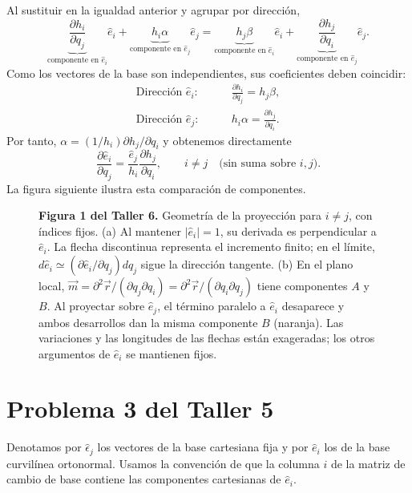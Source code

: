 Al sustituir en la igualdad anterior y agrupar por dirección,
\[
\underbrace{\frac{\partial h_i}{\partial q_j}}_{\text{componente en }\hat e_i}\hat e_i
+\underbrace{h_i\alpha}_{\text{componente en }\hat e_j}\hat e_j
=\underbrace{h_j\beta}_{\text{componente en }\hat e_i}\hat e_i
+\underbrace{\frac{\partial h_j}{\partial q_i}}_{\text{componente en }\hat e_j}\hat e_j.
\]
Como los vectores de la base son independientes, sus coeficientes deben coincidir:
\[
\begin{aligned}
\text{Dirección }\hat e_i:&\qquad
\frac{\partial h_i}{\partial q_j}=h_j\beta,\\
\text{Dirección }\hat e_j:&\qquad
h_i\alpha=\frac{\partial h_j}{\partial q_i}.
\end{aligned}
\]
Por tanto, $\alpha=(1/h_i)\partial h_j/\partial q_i$ y obtenemos directamente
\[
\boxed{\frac{\partial\hat e_i}{\partial q_j}
=\frac{\hat e_j}{h_i}\frac{\partial h_j}{\partial q_i}},
\qquad i\ne j\quad\text{(sin suma sobre $i,j$)}.
\]
La figura siguiente ilustra esta comparación de componentes.

\begin{figure}[H]
\centering

\par\medskip
\begin{minipage}{\textwidth}
\textbf{Figura 1 del Taller 6.} Geometría de la proyección para $i\ne j$, con índices fijos. (a) Al mantener $|\hat e_i|=1$, su derivada es perpendicular a $\hat e_i$. La flecha discontinua representa el incremento finito; en el límite, $d\hat e_i\simeq(\partial\hat e_i/\partial q_j)dq_j$ sigue la dirección tangente. (b) En el plano local, $\vec m=\partial^2\vec r/(\partial q_j\partial q_i)=\partial^2\vec r/(\partial q_i\partial q_j)$ tiene componentes $A$ y $B$. Al proyectar sobre $\hat e_j$, el término paralelo a $\hat e_i$ desaparece y ambos desarrollos dan la misma componente $B$ (naranja). Las variaciones y las longitudes de las flechas están exageradas; los otros argumentos de $\hat e_i$ se mantienen fijos.
\end{minipage}
\end{figure}

\section{Problema 3 del Taller 5}

Denotamos por $\hat\epsilon_j$ los vectores de la base cartesiana fija y por $\hat e_i$ los de la base curvilínea ortonormal. Usamos la convención de que la columna $i$ de la matriz de cambio de base contiene las componentes cartesianas de $\hat e_i$.


